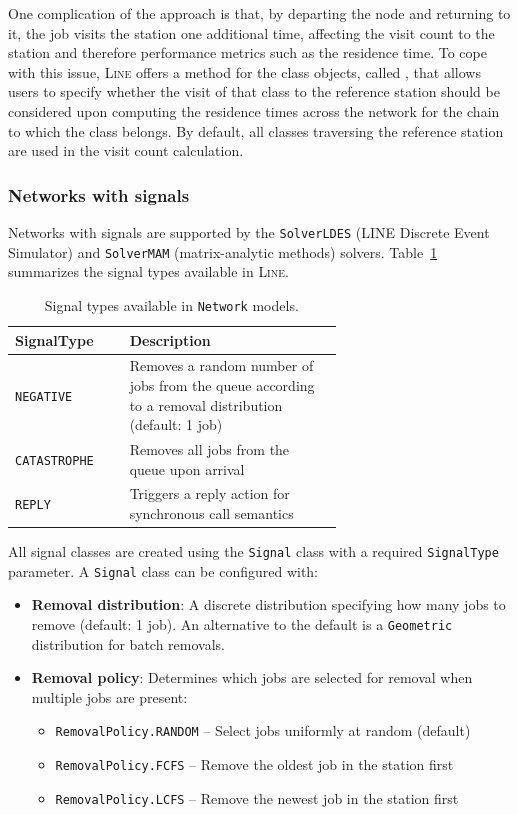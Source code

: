 One complication of the approach is that, by departing the node and returning to it, the job visits the station one additional time, affecting the visit count to the station and therefore performance metrics such as the residence time. To cope with this issue, \textsc{Line} offers a method for the class objects, called , that allows users to specify whether the visit of that class to the reference station should be considered upon computing the residence times across the network for the chain to which the class belongs. By default, all classes traversing the reference station are used in the visit count calculation.

\subsubsection{Networks with signals}
\label{signal-classes}
Networks with signals are supported by the \texttt{SolverLDES} (LINE Discrete Event Simulator) and \texttt{SolverMAM} (matrix-analytic methods) solvers. Table~\ref{tab:signal-types} summarizes the signal types available in \textsc{Line}.

\begin{table}[t!]
\centering
\caption{Signal types available in \texttt{Network} models.}
\label{tab:signal-types}
\begin{tabular}{|l|p{0.65\linewidth}|}
\hline
\textbf{SignalType} & \textbf{Description} \\
\hline
\texttt{NEGATIVE} & Removes a random number of jobs from the queue according to a removal distribution (default: 1 job) \\
\hline
\texttt{CATASTROPHE} & Removes all jobs from the queue upon arrival \\
\hline
\texttt{REPLY} & Triggers a reply action for synchronous call semantics \\
\hline
\end{tabular}
\end{table}

All signal classes are created using the \texttt{Signal} class with a required \texttt{SignalType} parameter. A \texttt{Signal} class can be configured with:
\begin{itemize}
\item \textbf{Removal distribution}: A discrete distribution specifying how many jobs to remove (default: 1 job). An alternative to the default is a \texttt{Geometric} distribution for batch removals.
\item \textbf{Removal policy}: Determines which jobs are selected for removal when multiple jobs are present:
  \begin{itemize}
  \item \texttt{RemovalPolicy.RANDOM} -- Select jobs uniformly at random (default)
  \item \texttt{RemovalPolicy.FCFS} -- Remove the oldest job in the station first
  \item \texttt{RemovalPolicy.LCFS} -- Remove the newest job in the station first
  \end{itemize}
\end{itemize}

